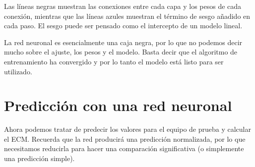 \documentclass[]{book}
\newenvironment{Shaded}{\begin{snugshade}}{\end{snugshade}}
\newcommand{\KeywordTok}[1]{\textcolor[rgb]{0.13,0.29,0.53}{\textbf{#1}}}
\newcommand{\DecValTok}[1]{\textcolor[rgb]{0.00,0.00,0.81}{#1}}
\newcommand{\StringTok}[1]{\textcolor[rgb]{0.31,0.60,0.02}{#1}}
\newcommand{\OperatorTok}[1]{\textcolor[rgb]{0.81,0.36,0.00}{\textbf{#1}}}
\newcommand{\NormalTok}[1]{#1}
\begin{document}
Las líneas negras muestran las conexiones entre cada capa y los pesos de
cada conexión, mientras que las líneas azules muestran el término de
sesgo añadido en cada paso. El sesgo puede ser pensado como el
intercepto de un modelo lineal.

La red neuronal es esencialmente una caja negra, por lo que no podemos
decir mucho sobre el ajuste, los pesos y el modelo. Basta decir que el
algoritmo de entrenamiento ha convergido y por lo tanto el modelo está
listo para ser utilizado.

\section{Predicción con una red
neuronal}\label{predicciuxf3n-con-una-red-neuronal}

Ahora podemos tratar de predecir los valores para el equipo de prueba y
calcular el ECM. Recuerda que la red producirá una predicción
normalizada, por lo que necesitamos reducirla para hacer una comparación
significativa (o simplemente una predicción simple).

\begin{Shaded}
\end{Shaded}
\end{document}
